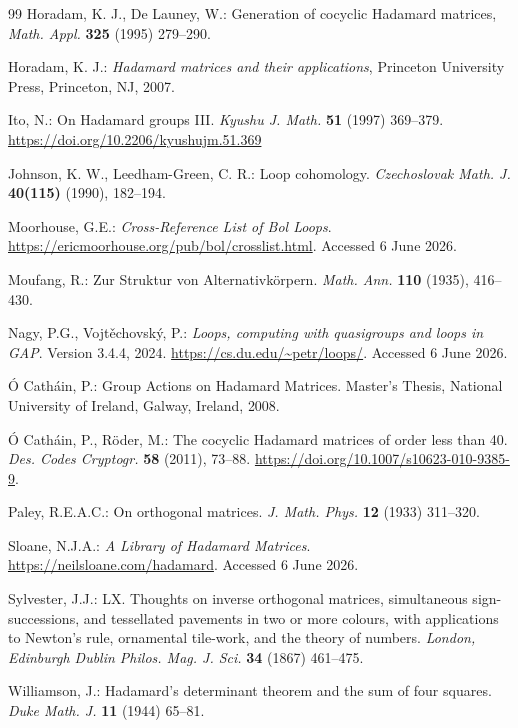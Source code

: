 \documentclass[11pt,a4paper]{article}
\begin{document}
\begin{thebibliography}{99}
 Horadam, K. J., De Launey, W.: Generation of cocyclic Hadamard matrices, {\em Math. Appl.} {\bf 325} (1995) 279--290.

 Horadam, K. J.: {\em Hadamard matrices and their applications}, Princeton University Press, Princeton, NJ, 2007.

 Ito, N.: On Hadamard groups III. {\em Kyushu J. Math.} {\bf 51} (1997) 369--379. \url{https://doi.org/10.2206/kyushujm.51.369}

 Johnson, K. W., Leedham-Green, C. R.: Loop cohomology. {\em Czechoslovak Math. J.} {\bf 40(115)} (1990), 182--194.

 Moorhouse, G.E.: {\em Cross-Reference List of Bol Loops}. \url{https://ericmoorhouse.org/pub/bol/crosslist.html}. Accessed 6 June 2026.

 Moufang, R.: Zur Struktur von Alternativk\"orpern. {\em Math. Ann.} {\bf 110} (1935), 416--430.

 Nagy, P.G., Vojt{\v{e}}chovsk{\'y}, P.: {\em Loops, computing with quasigroups and loops in GAP}. Version 3.4.4, 2024. \url{https://cs.du.edu/~petr/loops/}. Accessed 6 June 2026.

 \'{O} Cath\'{a}in, P.: Group Actions on Hadamard Matrices. Master's Thesis, National University of Ireland, Galway, Ireland, 2008.

 \'{O} Cath\'{a}in, P., R\"oder, M.: The cocyclic Hadamard matrices of order less than 40. {\em Des. Codes Cryptogr.} {\bf 58} (2011), 73--88. \url{https://doi.org/10.1007/s10623-010-9385-9}.

 Paley, R.E.A.C.: On orthogonal matrices. {\em J. Math. Phys.} {\bf 12} (1933) 311--320.

 Sloane, N.J.A.: {\em A Library of Hadamard Matrices}. \url{https://neilsloane.com/hadamard}. Accessed 6 June 2026.

 Sylvester, J.J.: LX. Thoughts on inverse orthogonal matrices, simultaneous sign-successions, and tessellated pavements in two or more colours, with applications to Newton's rule, ornamental tile-work, and the theory of numbers. {\em London, Edinburgh Dublin Philos. Mag. J. Sci.} {\bf 34} (1867) 461--475.

 Williamson, J.: Hadamard's determinant theorem and the sum of four squares. {\em Duke Math. J.} {\bf 11} (1944) 65--81.

\end{thebibliography}
\end{document}
